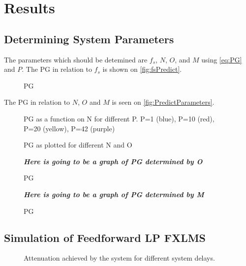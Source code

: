 \section{Results}
\subsection{Determining System Parameters}
The parameters which should be detemined are $f_s$, $N$, $O$, and $M$ using \autoref{eq:PG} and $P$.         
The PG in relation to $f_s$ is shown on \autoref{fig:fsPredict}.

\begin{figure}[H]
	\centering
	
	\caption{PG }
	\label{fig:fsPredict}
\end{figure}


The PG in relation to $N$, $O$ and $M$ is seen on \autoref{fig:PredictParameters}. 
\begin{figure}[H]
	\centering
	
	\caption{PG as a function on N for different P. P=1 (blue), P=10 (red), P=20 (yellow), P=42 (purple)}
	\label{fig:PredictN}
\end{figure}

\begin{figure}[H]
	\centering
	
	\caption{PG as plotted for different N and O}
	\label{fig:PredictN}
\end{figure}


\begin{figure}[H]
	\centering
	\textbf{\textit{Here is going to be a graph of PG determined by O}}
	\caption{PG }
	\label{fig:PredictO}
\end{figure}
\begin{figure}[H]
	\centering
	\textbf{\textit{Here is going to be a graph of PG determined by M}}
	\caption{PG }
	\label{fig:PredictM}
\end{figure}

\subsection{Simulation of Feedforward LP FXLMS}

\begin{figure}[H]
	\centering
	
	\caption{Attenuation achieved by the system for different system delays.}
	\label{Fig:Reference to noise ratio}
\end{figure}








